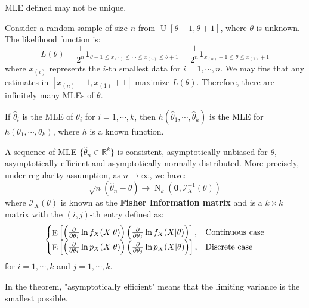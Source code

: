 \documentclass{huhtakm-template-book-v2}
\DeclareMathOperator{\E}{E}
\DeclareMathOperator{\N}{N}
\DeclareMathOperator{\U}{U}
\begin{document}
\newpage
\begin{rem}
	MLE defined may not be unique.
\end{rem}
\begin{eg}
	Consider a random sample of size $n$ from $\U[\theta-1,\theta+1]$, where $\theta$ is unknown. The likelihood function is:
	\begin{equation*}
		L(\theta)=\frac{1}{2^{n}}\mathbf{1}_{\theta-1\leq x_{(1)}\leq\cdots\leq x_{(n)}\leq\theta+1}=\frac{1}{2^{n}}\mathbf{1}_{x_{(n)}-1\leq\theta\leq x_{(1)}+1}
	\end{equation*}
	where $x_{(i)}$ represents the $i$-th smallest data for $i=1,\cdots,n$. We may fins that any estimates in $[x_{(n)}-1,x_{(1)}+1]$ maximize $L(\theta)$. Therefore, there are infinitely many MLEs of $\theta$.
\end{eg}
\begin{lem}
	If $\hat{\theta}_{i}$ is the MLE of $\theta_{i}$ for $i=1,\cdots,k$, then $h(\hat{\theta}_{1},\cdots,\hat{\theta}_{k})$ is the MLE for $h(\theta_{1},\cdots,\theta_{k})$, where $h$ is a known function.
\end{lem}
\begin{thm}
	\label{Chapter 2 (Thoerem) Sequence of MLE is asympt. normal}
	A sequence of MLE $\{\hat{\theta}_{n}\in\mathbb{R}^{k}\}$ is consistent, asymptotically unbiased for $\theta$, asymptotically efficient and asymptotically normally distributed. More precisely, under regularity assumption, as $n\to\infty$, we have:
	\begin{equation*}
		\sqrt{n}(\hat{\theta}_{n}-\theta)\to\N_{k}(\mathbf{0},\mathcal{I}_{X}^{-1}(\theta))
	\end{equation*}
	where $\mathcal{I}_{X}(\theta)$ is known as the \textbf{Fisher Information matrix} and is a $k\times k$ matrix with the $(i,j)$-th entry defined as:
	\begin{equation*}
		\begin{cases}
			\E\left[\left(\pdv*{\ln{f_{X}(X|\theta)}}{\theta_{i}}\right)\left(\pdv*{\ln{f_{X}(X|\theta)}}{\theta_{j}}\right)\right], &\text{Continuous case}\\
			\E\left[\left(\pdv*{\ln{p_{X}(X|\theta)}}{\theta_{i}}\right)\left(\pdv*{\ln{p_{X}(X|\theta)}}{\theta_{j}}\right)\right], &\text{Discrete case}
		\end{cases}
	\end{equation*}
	for $i=1,\cdots,k$ and $j=1,\cdots,k$.
\end{thm}
\begin{rem}
	In the theorem, "asymptotically efficient" means that the limiting variance is the smallest possible.
\end{rem}
\end{document}
